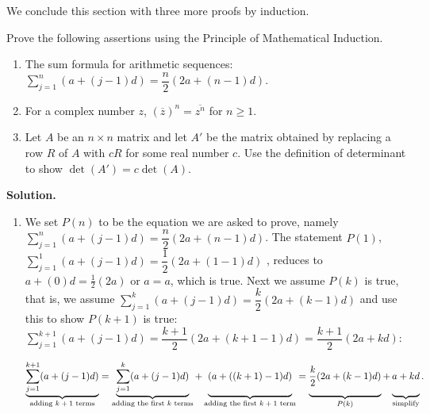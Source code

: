 \documentclass{ximera}
\begin{document}
\smallskip

We conclude this section with three more proofs by induction.

\newpage


\begin{ex} \label{inductionex02} Prove the following assertions using the Principle of Mathematical Induction.

\begin{enumerate}

\item  The sum formula for arithmetic sequences: $\displaystyle{\sum_{j=1}^{n} (a + (j-1)d) = \dfrac{n}{2}(2a + (n-1)d)}$.

\item  For a complex number $z$, $\left(\overline{z}\right)^n = \overline{z^{n}}$ for $n \geq 1$.

\item  Let $A$ be an $n \times n$ matrix and let $A'$ be the matrix obtained by replacing a row $R$ of $A$ with $cR$ for some real number $c$.  Use the definition of determinant to show $\det(A') = c \det(A)$.


\end{enumerate}

{\bf Solution.}

\begin{enumerate}

\item We set $P(n)$ to be the equation we are asked to prove, namely  $\displaystyle{\sum_{j=1}^{n} (a + (j-1)d) = \dfrac{n}{2}(2a + (n-1)d)}$.  The statement $P(1)$,  $\displaystyle{\sum_{j=1}^{1} (a + (j-1)d) = \dfrac{1}{2}(2a + (1-1)d)}$ ,  reduces to  $a+(0)d = \frac{1}{2} (2a)$ or $a = a$, which is true.  Next we assume $P(k)$ is true, that is, we assume $\displaystyle{\sum_{j=1}^{k} (a + (j-1)d)  = \dfrac{k}{2}(2a + (k-1)d)}$ and use this to  show $P(k+1)$ is true: $\displaystyle{\sum_{j=1}^{k+1} (a + (j-1)d)  =  \dfrac{k+1}{2}(2a + (k+1-1)d) = \dfrac{k+1}{2}(2a + kd)}$:

\[ \underbrace{\displaystyle{\sum_{j=1}^{k+1} (a + (j-1)d)}}_{\text{adding $k+1$ terms}}  = \underbrace{\displaystyle{\sum_{j=1}^{k} (a + (j-1)d)}}_{\text{adding the first $k$ terms}} + \underbrace{(a+((k+1)-1)d ) \vphantom{\displaystyle{\sum_{j=1}^{k+1}}} }_{\text{adding the first $k+1$ term}} =  \underbrace{\dfrac{k}{2}(2a + (k-1)d)\vphantom{\displaystyle{\sum_{j=1}^{k+1}}} }_{\text{$P(k)$}} +\underbrace{a+kd \vphantom{\displaystyle{\sum_{j=1}^{k+1}}} }_{\text{simplify}}.\]



\end{enumerate}
\end{ex}
\end{document}
